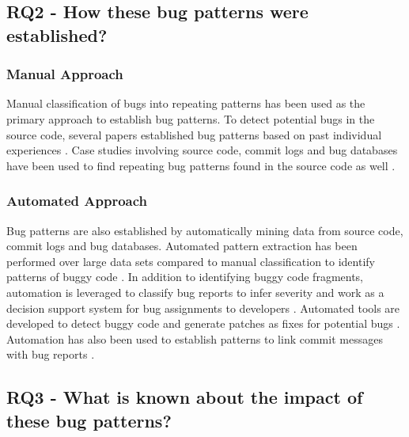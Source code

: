 \documentclass[conference]{IEEEtran}
\begin{document}
\subsection{RQ2 - How these bug patterns were established?} %
\label{sub:item_rq2}

\subsubsection{Manual Approach}
Manual classification of bugs into repeating patterns has been used as the primary approach to establish bug patterns. To detect potential bugs in the source code, several papers established bug patterns based on past individual experiences \cite{bug_patterns_allen, on_identifying_zhang, ontology_lu, database_ahsan}. Case studies involving source code, commit logs and bug databases have been used to find repeating bug patterns found in the source code as well \cite{Empirical_Ocariza, Empirical_Zhang}.

\subsubsection{Automated Approach}
Bug patterns are also established by automatically mining data from source code, commit logs and bug databases. Automated pattern extraction has been performed over large data sets compared to manual classification to identify patterns of buggy code \cite{Personalized_Jiang, Mining_Osman}. In addition to identifying buggy code fragments, automation is leveraged to classify bug reports to infer severity and work as a decision support system for bug assignments to developers \cite{determining_chaturvedi, predicting_nagwani}. Automated tools are developed to detect buggy code and generate patches as fixes for potential bugs \cite{making_al_ameen,R2Fix_Liu}. Automation has also been used to establish patterns to link commit messages with bug reports \cite{relink_wu}.


\subsection{RQ3 - What is known about the impact of these bug patterns?} %
\label{sub:item_rq3}
\end{document}
